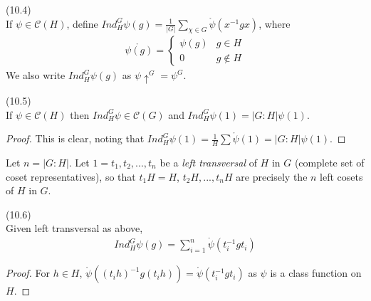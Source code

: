 \documentclass[a4paper]{article}
\begin{document}
\begin{defi} (10.4)\\
If $\psi \in \mathcal{C}(H)$, define $Ind_H^G \psi(g) = \frac{1}{|G|} \sum_{\chi \in G} \mathring{\psi} (x^{-1} gx)$, where
\begin{equation*}
\begin{aligned}
\mathring{\psi(g)} = \left\{\begin{array}{ll}
\psi(g) & g \in H\\
0 & g \not\in H
\end{array}
\right.
\end{aligned}
\end{equation*}
We also write $Ind_H^G \psi (g)$ as $\psi \uparrow^G = \psi^G$.
\end{defi}

\begin{lemma} (10.5)\\
If $\psi \in \mathcal{C}(H)$ then $Ind_H^G \psi \in \mathcal{C}(G)$ and $Ind_H^G \psi(1) = |G:H|\psi(1)$.
\begin{proof}
This is clear, noting that $Ind_H^G \psi(1) = \frac{1}{H} \sum \mathring{\psi}(1) = |G:H| \psi(1)$.
\end{proof}
\end{lemma}

Let $n = |G:H|$. Let $1=t_1,t_2,...,t_n$ be a \emph{left transversal} of $H$ in $G$ (complete set of coset representatives), so that $t_1H = H$, $t_2H,...,t_nH$ are precisely the $n$ left cosets of $H$ in $G$.

\begin{lemma} (10.6)\\
Given left transversal as above,
\begin{equation*}
\begin{aligned}
Ind_H^G \psi(g) = \sum_{i=1}^n \mathring{\psi} (t_i^{-1} gt_i)
\end{aligned}
\end{equation*}
\begin{proof}
For $h \in H$, $\mathring{\psi}((t_i h)^{-1} g(t_ih)) = \mathring{\psi} (t_i^{-1} g t_i)$ as $\psi$ is a class function on $H$.
\end{proof}
\end{lemma}
\end{document}
